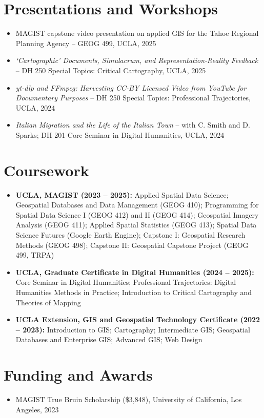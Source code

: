 \documentclass[letterpaper,10pt]{article}
\newlength{\bulletgap}  \setlength{\bulletgap}{0pt}  %
\newlength{\groupindent}\setlength{\groupindent}{0.15in} %
\newcommand{\resumeItem}[1]{\item \small{#1}}
\newif\ifresumecont \resumecontfalse
\newcommand{\resumeItemListStart}{%
  \begin{itemize}[leftmargin=\groupindent, itemsep=\bulletgap,
                  parsep=0pt, topsep=1pt, partopsep=0pt]}
\newcommand{\resumeItemListEnd}{\resumecontfalse\end{itemize}}
\begin{document}
\section{Presentations and Workshops}
    \resumeItemListStart
      \resumeItem{\small MAGIST capstone video presentation on applied GIS for the Tahoe Regional Planning Agency -- GEOG 499, UCLA, 2025}
      \resumeItem{\textit{\small `Cartographic' Documents, Simulacrum, and Representation-Reality Feedback} -- DH 250 Special Topics: Critical Cartography, UCLA, 2025}
      \resumeItem{\textit{\small yt-dlp and FFmpeg: Harvesting CC-BY Licensed Video from YouTube for Documentary Purposes} -- DH 250 Special Topics: Professional Trajectories, UCLA, 2024}
      \resumeItem{\textit{\small Italian Migration and the Life of the Italian Town} -- with C. Smith and D. Sparks; DH 201 Core Seminar in Digital Humanities, UCLA, 2024}
    \resumeItemListEnd


\section{Coursework}
    \resumeItemListStart
      \resumeItem{\textbf{UCLA, MAGIST (2023 -- 2025):} Applied Spatial Data Science; Geospatial Databases and Data Management (GEOG 410); Programming for Spatial Data Science I (GEOG 412) and II (GEOG 414); Geospatial Imagery Analysis (GEOG 411); Applied Spatial Statistics (GEOG 413); Spatial Data Science Futures (Google Earth Engine); Capstone I: Geospatial Research Methods (GEOG 498); Capstone II: Geospatial Capstone Project (GEOG 499, TRPA)}
      \resumeItem{\textbf{UCLA, Graduate Certificate in Digital Humanities (2024 -- 2025):} Core Seminar in Digital Humanities; Professional Trajectories: Digital Humanities Methods in Practice; Introduction to Critical Cartography and Theories of Mapping}
      \resumeItem{\textbf{UCLA Extension, GIS and Geospatial Technology Certificate (2022 -- 2023):} Introduction to GIS; Cartography; Intermediate GIS; Geospatial Databases and Enterprise GIS; Advanced GIS; Web Design}
    \resumeItemListEnd


\section{Funding and Awards}
    \resumeItemListStart
      \resumeItem{\small MAGIST True Bruin Scholarship (\$3,848), University of California, Los Angeles, 2023}
    \resumeItemListEnd
\end{document}
